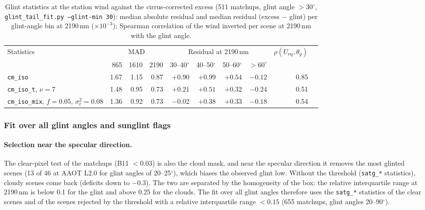 \documentclass[11pt,a4paper]{article}
\newcommand{\code}[1]{\texttt{#1}}
\begin{document}
\begin{table}[h]
\centering\small
\caption{Glint statistics at the station wind against the cirrus-corrected excess (511 matchups, glint angle
$>30^\circ$, \code{glint\_tail\_fit.py --glint-min 30}): median absolute residual and median residual (excess $-$ glint) per glint-angle bin at
2190\,nm ($\times10^{-3}$); Spearman correlation of the wind inverted per scene at 2190\,nm with the glint angle.}
\label{tab:glint_tail}
\begin{tabular}{lrrrrrrrrr}
\toprule
Statistics & \multicolumn{3}{c}{MAD} & \multicolumn{4}{c}{Residual at 2190\,nm} & $\rho(U_\mathrm{eq},\theta_g)$ \\
 & 865 & 1610 & 2190 & 30--40$^\circ$ & 40--50$^\circ$ & 50--60$^\circ$ & $>60^\circ$ & \\
\midrule
\code{cm\_iso}                         & 1.67 & 1.15 & 0.87 & $+0.90$ & $+0.99$ & $+0.54$ & $-0.12$ & 0.85 \\
\code{cm\_iso\_t}, $\nu=7$             & 1.48 & 0.95 & 0.73 & $+0.21$ & $+0.51$ & $+0.32$ & $-0.24$ & 0.51 \\
\code{cm\_iso\_mix}, $f=0.05$, $\sigma_t^2=0.08$ & 1.36 & 0.92 & 0.73 & $-0.02$ & $+0.38$ & $+0.33$ & $-0.18$ & 0.54 \\
\bottomrule
\end{tabular}
\end{table}

\subsubsection{Fit over all glint angles and sunglint flags}
\label{sec:glint_flags}
\paragraph{Selection near the specular direction.} The clear-pixel test of the matchups (B11 $<0.03$) is also the
cloud mask, and near the specular direction it removes the most glinted scenes (13 of 46 at AAOT L2.0 for glint
angles of 20--25$^\circ$), which biases the observed glint low. Without the threshold (\code{satg\_*} statistics),
cloudy scenes come back (deficits down to $-0.3$). The two are separated by the homogeneity of the box: the relative
interquartile range at 2190\,nm is below 0.1 for the glint and above 0.25 for the clouds. The fit over all glint
angles therefore uses the \code{satg\_*} statistics of the clear scenes and of the scenes rejected by the threshold
with a relative interquartile range $<0.15$ (655 matchups, glint angles 20--90$^\circ$).
\end{document}
